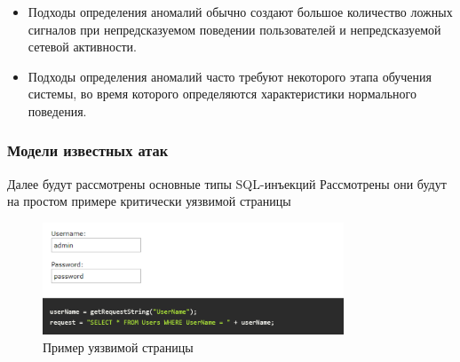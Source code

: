 \begin{itemize}
	\item Подходы определения аномалий обычно создают большое количество ложных сигналов 
	при непредсказуемом поведении пользователей и непредсказуемой сетевой активности.

	\item Подходы определения аномалий часто требуют некоторого этапа обучения системы, 
	во время которого определяются характеристики нормального поведения.
\end{itemize}



\subsubsection{Модели известных атак}

Далее будут рассмотрены основные типы SQL-инъекций \autocite{SqlInjection} Рассмотрены они будут на простом примере критически уязвимой страницы
\begin{figure}[h]
    \centering
    \includegraphics[width=0.8\textwidth]{assets/sql_ijection_example.png}
    \caption{Пример уязвимой страницы}
    \label{fig:mesh1}
\end{figure}


